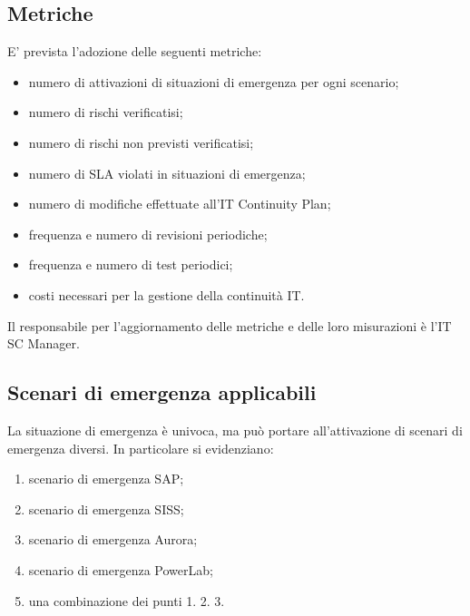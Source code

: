 \subsection{Metriche}
E' prevista l'adozione delle seguenti metriche:
\begin{itemize}
\item numero di attivazioni di situazioni di emergenza per ogni scenario;
\item numero di rischi verificatisi;
\item numero di rischi non previsti verificatisi;
\item numero di SLA violati in situazioni di emergenza;
\item numero di modifiche effettuate all'IT Continuity Plan;
\item frequenza e numero di revisioni periodiche;
\item frequenza e numero di test periodici;
\item costi necessari per la gestione della continuità IT.
\end{itemize}
Il responsabile per l'aggiornamento delle metriche e delle loro misurazioni è l'IT SC Manager.

\subsection{Scenari di emergenza applicabili}
La situazione di emergenza è univoca, ma può portare all'attivazione di scenari di emergenza diversi. In particolare si evidenziano:
\begin{enumerate}
    \item scenario di emergenza SAP;
    \item scenario di emergenza SISS;
    \item scenario di emergenza Aurora;
    \item scenario di emergenza PowerLab;
    \item una combinazione dei punti 1. 2. 3.
\end{enumerate}

